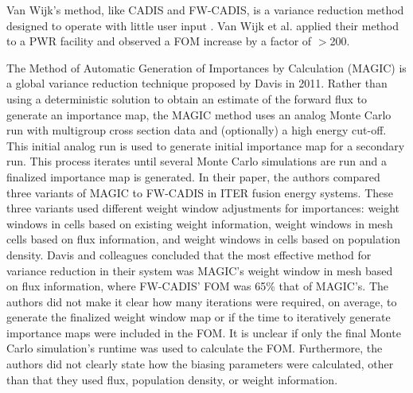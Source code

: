 Van Wijk's method, like CADIS and FW-CADIS, is a variance reduction method
designed to operate with little user input \cite{van_wijk_easy_2011}.
Van Wijk et al. applied their method to a PWR facility and observed a FOM
increase by a factor of $>$200.


The Method of Automatic Generation of Importances by Calculation (MAGIC) is a
global variance reduction technique \cite{davis_comparison_2011} proposed by
Davis in 2011.
Rather than using a deterministic solution to obtain an estimate of the forward
flux to generate an importance map, the MAGIC method uses an analog Monte Carlo
run with multigroup cross section data and (optionally) a high energy cut-off.
This initial analog run is used to generate initial importance map for a
secondary run.
This process iterates until several Monte Carlo simulations are run and a
finalized importance map is generated.
In their paper, the authors compared three variants of MAGIC to FW-CADIS in ITER
fusion energy systems.
These three variants used different weight window adjustments for importances:
weight windows in cells based on existing weight information, weight windows in
mesh cells based on flux information, and weight windows in cells based on
population density.
Davis and colleagues concluded that the most effective method for variance
reduction in their system was MAGIC's weight window in mesh based on flux
information, where FW-CADIS' FOM was 65\% that of MAGIC's.
The authors did not make it clear how many iterations were required, on average,
to generate the finalized weight window map or if the time to iteratively
generate importance maps were included in the FOM.
It is unclear if only the final Monte Carlo simulation's runtime was used to
calculate the FOM.
Furthermore, the authors did not clearly state how the biasing parameters were
calculated, other than that they used flux, population density, or weight
information.
%
%


